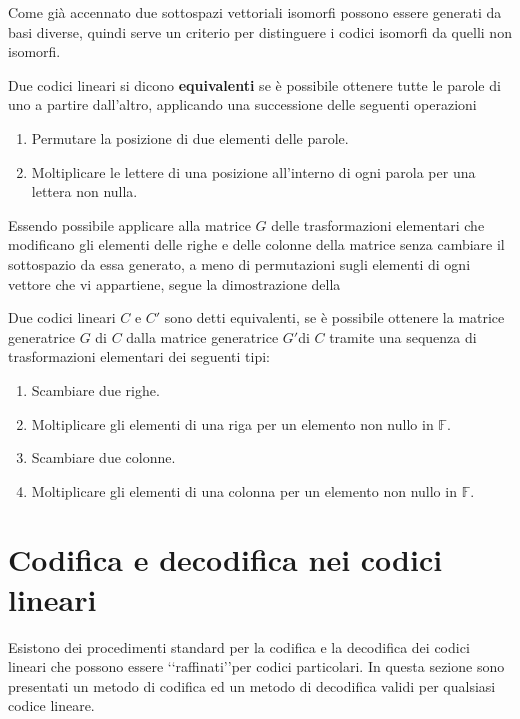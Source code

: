 Come già accennato due sottospazi vettoriali isomorfi possono essere generati da basi diverse, quindi serve un criterio per distinguere i codici isomorfi da quelli non isomorfi.
\begin{definizione}
   Due codici lineari si dicono {\bf equivalenti} se è possibile ottenere tutte le parole di uno a partire dall'altro, applicando una successione delle seguenti operazioni
   \begin{enumerate}
      \item Permutare la posizione di due elementi delle parole.
      \item Moltiplicare le lettere di una posizione all'interno di ogni parola per una lettera non nulla.
   \end{enumerate}
\end{definizione}
\noindent
Essendo possibile applicare alla matrice $G$ delle trasformazioni elementari che modificano gli elementi delle righe e delle colonne della matrice senza cambiare il sottospazio da essa generato, a meno di permutazioni sugli elementi di ogni vettore che vi appartiene, segue la dimostrazione della
\begin{prop}
   Due codici lineari $C$ e $C'$ sono detti equivalenti, se è possibile ottenere la matrice generatrice $G$ di $C$ dalla matrice generatrice $G'$di $C$ tramite una sequenza di trasformazioni elementari dei seguenti tipi:
   \begin{enumerate}
      \item Scambiare due righe.
      \item Moltiplicare gli elementi di una riga per un elemento non nullo in $\mathbb{F}$.
      \item Scambiare due colonne.
      \item Moltiplicare gli elementi di una colonna per un elemento non nullo in $\mathbb{F}$.
   \end{enumerate}
\end{prop}


\section{Codifica e decodifica nei codici lineari}

Esistono dei procedimenti standard per la codifica e la decodifica dei codici lineari che possono essere \lq\lq raffinati\rq\rq per codici particolari. In questa sezione sono presentati un metodo di codifica ed un metodo di decodifica validi per qualsiasi codice lineare.

